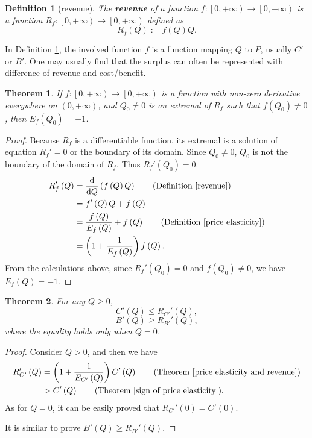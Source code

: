 \documentclass{article}
\newtheorem{theorem}{Theorem}
\newtheorem{definition}{Definition}
\begin{document}
\begin{definition}[revenue]
\label{revenue}
The \textbf{revenue} of a function $f:\left[0,+\infty\right)\to\left[0,+\infty\right)$ is a function $R_f:\left[0,+\infty\right)\to\left[0,+\infty\right)$ defined as
$$R_f\left(Q\right):=f\left(Q\right)Q.$$
\end{definition}

In Definition \ref{revenue}, the involved function $f$ is a function mapping $Q$ to $P$, usually $C'$ or $B'$.
One may usually find that the surplus can often be represented with difference of revenue and cost/benefit.

\begin{theorem}
\label{price elasticity and revenue}
If $f:\left[0,+\infty\right)\to\left[0,+\infty\right)$ is a function with non-zero derivative everywhere on $\left(0,+\infty\right)$, and $Q_0\ne0$ is an extremal of $R_f$ such that $f\left(Q_0\right)\ne0$, then $E_f\left(Q_0\right)=-1$.
\end{theorem}
\begin{proof}
Because $R_f$ is a differentiable function, its extremal is a solution of equation $R_f'=0$ or the boundary of its domain.
Since $Q_0\ne0$, $Q_0$ is{} not the boundary of the domain of $R_f$.
Thus $R_f'\left(Q_0\right)=0$.
\begin{align*}
R_f'\left(Q\right)&=\frac{\mathrm d}{\mathrm dQ}\left(f\left(Q\right)Q\right)\qquad\text{(Definition \ref{revenue})}\\
&=f'\left(Q\right)Q+f\left(Q\right)\\
&=\frac{f\left(Q\right)}{E_f\left(Q\right)}+f\left(Q\right)\qquad\text{(Definition \ref{price elasticity})}\\
&=\left(1+\frac1{E_f\left(Q\right)}\right)f\left(Q\right).
\end{align*}
From the calculations above, since $R_f'\left(Q_0\right)=0$ and $f\left(Q_0\right)\ne0$, we have $E_f\left(Q\right)=-1$.
\end{proof}

\begin{theorem}
\label{inequality of revenue and supply and demand}
For any $Q\ge0$,
$$C'\left(Q\right)\le R_{C'}'\left(Q\right),$$
$$B'\left(Q\right)\ge R_{B'}'\left(Q\right),$$
where the equality holds only when $Q=0$.
\end{theorem}
\begin{proof}
Consider $Q>0$, and then we have
\begin{align*}
R_{C'}'\left(Q\right)&=\left(1+\frac1{E_{C'}\left(Q\right)}\right)C'\left(Q\right)\qquad\text{(Theorem \ref{price elasticity and revenue})}\\
&>C'\left(Q\right)\qquad\text{(Theorem \ref{sign of price elasticity})}.
\end{align*}
As for $Q=0$, it can be easily proved that $R_{C'}'\left(0\right)=C'\left(0\right)$.

It is similar to prove $B'\left(Q\right)\ge R_{B'}'\left(Q\right)$.
\end{proof}
\end{document}
